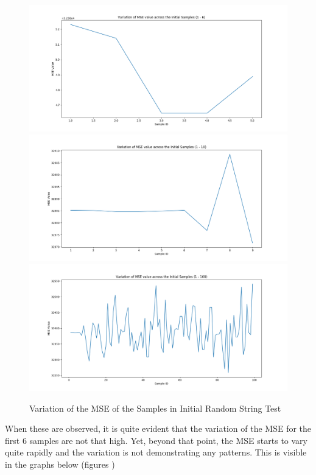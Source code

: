 \begin{figure}[h!]
    \includegraphics[width=1.0\textwidth]{images/mse_init_1_6.png}
    \includegraphics[width=1.0\textwidth]{images/mse_init_1_10.png}
    \includegraphics[width=1.0\textwidth]{images/mse_init_1_100.png}
    \centering
    \caption{Variation of the MSE of the Samples in Initial Random String Test}
    \label{fig:4_mse_var_init_samples}
\end{figure}

When these are observed, it is quite evident that the variation of the MSE for the first 6 samples are not that high. Yet, beyond that point, the MSE starts to vary quite rapidly and the variation is not demonstrating any patterns. This is visible in the graphs below (figures )

